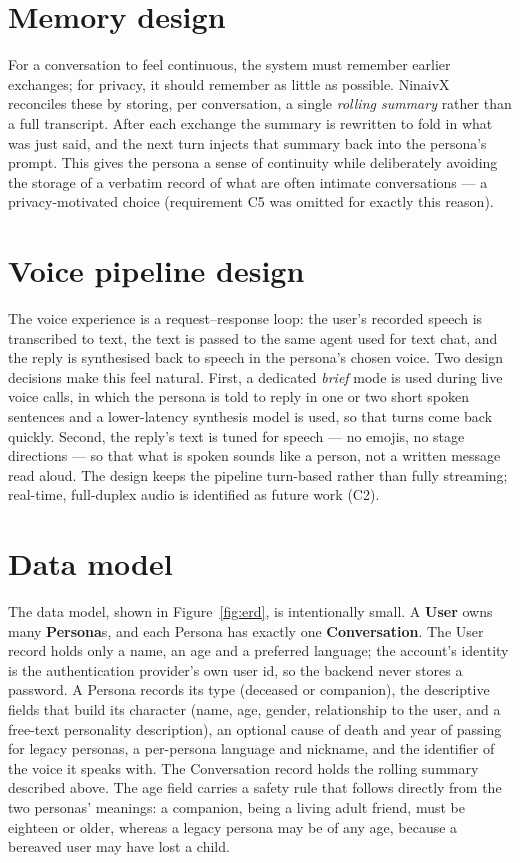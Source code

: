 \documentclass[11pt,a4paper]{report}
\begin{document}
\section{Memory design}
For a conversation to feel continuous, the system must remember earlier exchanges; for privacy, it should remember as little as possible. NinaivX reconciles these by storing, per conversation, a single \emph{rolling summary} rather than a full transcript. After each exchange the summary is rewritten to fold in what was just said, and the next turn injects that summary back into the persona's prompt. This gives the persona a sense of continuity while deliberately avoiding the storage of a verbatim record of what are often intimate conversations --- a privacy-motivated choice (requirement C5 was omitted for exactly this reason).

\section{Voice pipeline design}
The voice experience is a request--response loop: the user's recorded speech is transcribed to text, the text is passed to the same agent used for text chat, and the reply is synthesised back to speech in the persona's chosen voice. Two design decisions make this feel natural. First, a dedicated \emph{brief} mode is used during live voice calls, in which the persona is told to reply in one or two short spoken sentences and a lower-latency synthesis model is used, so that turns come back quickly. Second, the reply's text is tuned for speech --- no emojis, no stage directions --- so that what is spoken sounds like a person, not a written message read aloud. The design keeps the pipeline turn-based rather than fully streaming; real-time, full-duplex audio is identified as future work (C2).

\section{Data model}
\label{sec:datamodel}
The data model, shown in Figure~\ref{fig:erd}, is intentionally small. A \textbf{User} owns many \textbf{Persona}s, and each Persona has exactly one \textbf{Conversation}. The User record holds only a name, an age and a preferred language; the account's identity is the authentication provider's own user id, so the backend never stores a password. A Persona records its type (deceased or companion), the descriptive fields that build its character (name, age, gender, relationship to the user, and a free-text personality description), an optional cause of death and year of passing for legacy personas, a per-persona language and nickname, and the identifier of the voice it speaks with. The Conversation record holds the rolling summary described above. The age field carries a safety rule that follows directly from the two personas' meanings: a companion, being a living adult friend, must be eighteen or older, whereas a legacy persona may be of any age, because a bereaved user may have lost a child.
\end{document}

